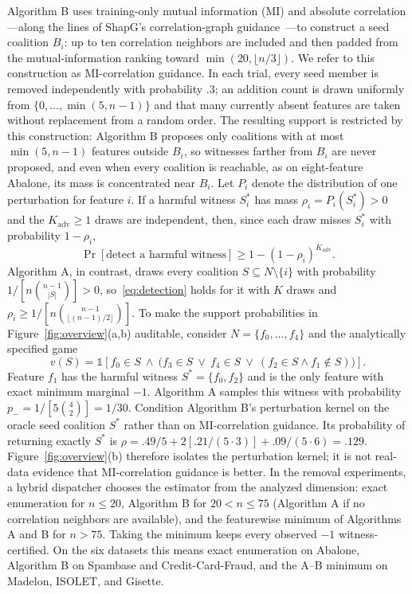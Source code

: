 \documentclass{article}
\begin{document}
Algorithm B uses training-only mutual information (MI) and absolute correlation---along the lines of ShapG's correlation-graph guidance~\citep{zhao2025shapg}---to construct a seed coalition $B_i$: up to ten correlation neighbors are included and then padded from the mutual-information ranking toward $\min(20,\lfloor n/3\rfloor)$. We refer to this construction as MI-correlation guidance. In each trial, every seed member is removed independently with probability $.3$; an addition count is drawn uniformly from $\{0,\ldots,\min(5,n-1)\}$ and that many currently absent features are taken without replacement from a random order. The resulting support is restricted by this construction: Algorithm B proposes only coalitions with at most $\min(5,n-1)$ features outside $B_i$, so witnesses farther from $B_i$ are never proposed, and even when every coalition is reachable, as on eight-feature Abalone, its mass is concentrated near $B_i$. Let $P_i$ denote the distribution of one perturbation for feature $i$. If a harmful witness $S_i^*$ has mass $\rho_i=P_i(S_i^*)>0$ and the $K_{\mathrm{adv}}\geq1$ draws are independent, then, since each draw misses $S_i^*$ with probability $1-\rho_i$,
\begin{equation}
\Pr[\text{detect a harmful witness}]\geq 1-(1-\rho_i)^{K_{\mathrm{adv}}}.
\label{eq:detection}
\end{equation}
 Algorithm A, in contrast, draws every coalition $S\subseteq N\setminus\{i\}$ with probability $1/[n\binom{n-1}{|S|}]>0$, so~\eqref{eq:detection} holds for it with $K$ draws and $\rho_i\geq1/[n\binom{n-1}{\lfloor(n-1)/2\rfloor}]$. To make the support probabilities in Figure~\ref{fig:overview}(a,b) auditable, consider $N=\{f_0,\ldots,f_4\}$ and the analytically specified game
\begin{equation}
v(S)=\mathbb{1}\!\left[f_0\in S\ \land\ \bigl(f_3\in S\ \lor\ f_4\in S\ \lor\ (f_2\in S\land f_1\notin S)\bigr)\right].
\label{eq:constructed-game}
\end{equation}
Feature $f_1$ has the harmful witness $S^*=\{f_0,f_2\}$ and is the only feature with exact minimum marginal $-1$. Algorithm A samples this witness with probability $p_-=1/[5\binom{4}{2}]=1/30$. Condition Algorithm B's perturbation kernel on the oracle seed coalition $S^*$ rather than on MI-correlation guidance. Its probability of returning exactly $S^*$ is
$\rho=.49/5+2[.21/(5\cdot3)]+.09/(5\cdot6)=.129$.
Figure~\ref{fig:overview}(b) therefore isolates the perturbation kernel; it is not real-data evidence that MI-correlation guidance is better. In the removal experiments, a hybrid dispatcher chooses the estimator from the analyzed dimension: exact enumeration for $n\leq20$, Algorithm B for $20<n\leq75$ (Algorithm A if no correlation neighbors are available), and the featurewise minimum of Algorithms A and B for $n>75$. Taking the minimum keeps every observed $-1$ witness-certified. On the six datasets this means exact enumeration on Abalone, Algorithm B on Spambase and Credit-Card-Fraud, and the A--B minimum on Madelon, ISOLET, and Gisette.
\end{document}
